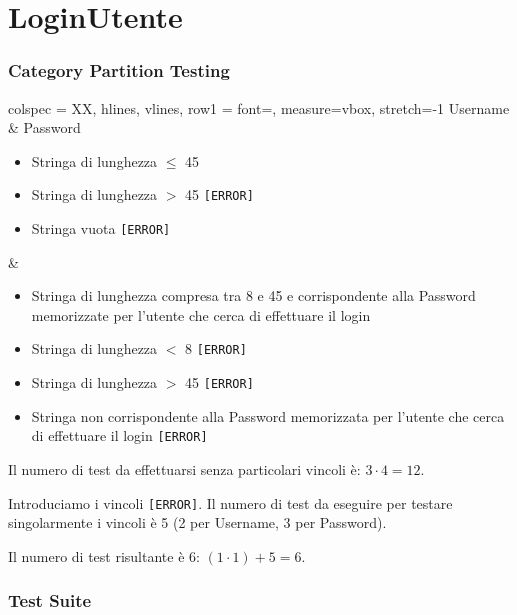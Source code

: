 \section{LoginUtente}

\subsubsection*{Category Partition Testing}

\begin{table}[!hbp]
	\centering
	\footnotesize
	\begin{tblr}{
		colspec = XX,
		hlines, vlines,
		row{1} = {font=\bfseries},
		measure=vbox, stretch=-1
		}
		Username & Password \\
		\begin{itemize}[leftmargin=*]
			\item Stringa di lunghezza $\leq$ 45
			\item Stringa di lunghezza $>$ 45 \texttt{[ERROR]}
			\item Stringa vuota \texttt{[ERROR]}
		\end{itemize} &
		\begin{itemize}[leftmargin=*]
			\item Stringa di lunghezza compresa tra 8 e 45 e corrispondente alla Password memorizzate per l'utente che cerca di effettuare il login
			\item Stringa di lunghezza $<$ 8 \texttt{[ERROR]}
			\item Stringa di lunghezza $>$ 45 \texttt{[ERROR]}
			\item Stringa non corrispondente alla Password memorizzata per l'utente che cerca di effettuare il login \texttt{[ERROR]}
		\end{itemize}
	\end{tblr}
\end{table}

\noindent Il numero di test da effettuarsi senza particolari vincoli è: $3 \cdot 4 = 12$.

\noindent Introduciamo i vincoli \texttt{[ERROR]}. Il numero di test da eseguire per testare singolarmente i vincoli è 5 (2 per Username, 3 per Password).

\noindent Il numero di test risultante è 6: $(1 \cdot 1) + 5 = 6$.

\subsubsection*{Test Suite}

